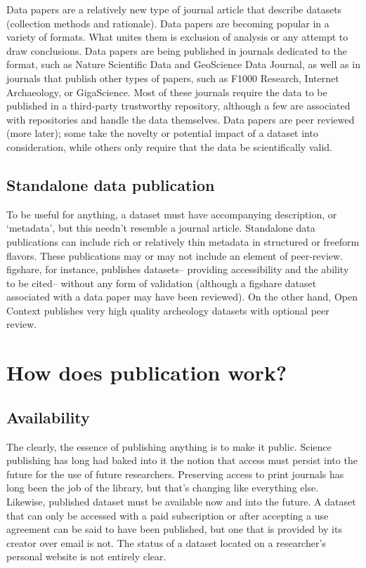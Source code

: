\documentclass{article}
\begin{document}
Data papers are a relatively new type of journal article that describe datasets (collection methods and rationale).
Data papers are becoming popular in a variety of formats.
What unites them is exclusion of analysis or any attempt to draw conclusions.
Data papers are being published in journals dedicated to the format, such as Nature Scientific Data and GeoScience Data Journal, as well as in journals that publish other types of papers, such as F1000 Research, Internet Archaeology, or GigaScience.
Most of these journals require the data to be published in a third-party trustworthy repository, although a few are associated with repositories and handle the data themselves.
Data papers are peer reviewed (more later); some take the novelty or potential impact of a dataset into consideration, while others only require that the data be scientifically valid.

\subsection{Standalone data publication}\label{standalone-data-publication}

To be useful for anything, a dataset must have accompanying description, or `metadata', but this needn't resemble a journal article. Standalone data publications can include rich or relatively thin metadata in structured or freeform flavors.
These publications may or may not include an element of peer-review.
figshare, for instance, publishes datasets-- providing accessibility and the ability to be cited-- without any form of validation (although a figshare dataset associated with a data paper may have been reviewed).
On the other hand, Open Context publishes very high quality archeology datasets with optional peer review.

\section{How does publication work?}\label{how-does-publication-work}

\subsection{Availability}\label{availability}

The clearly, the essence of publishing anything is to make it public.
Science publishing has long had baked into it the notion that access must persist into the future for the use of future researchers.
Preserving access to print journals has long been the job of the library, but that's changing like everything else.
Likewise, published dataset must be available now and into the future.
A dataset that can only be accessed with a paid subscription or after accepting a use agreement can be said to have been published, but one that is provided by its creator over email is not.
The status of a dataset located on a researcher's personal website is not entirely clear.
\end{document}

